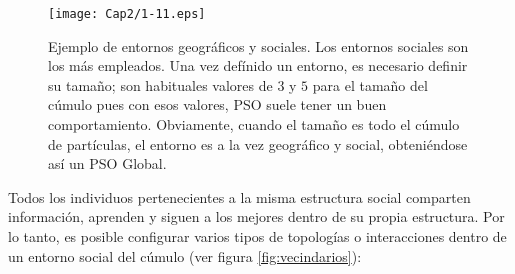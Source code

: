   \begin{figure}
	\centering
	\texttt{[image: Cap2/1-11.eps]}
	  \caption[Ejemplo de entornos geogr\'aficos y sociales]{Ejemplo de entornos geogr\'aficos y sociales. Los entornos sociales son los 
	  m\'as empleados. Una vez def\'inido un entorno, es necesario definir su tama\~no; son habituales valores de $3$ y $5$ 
	  para el tama\~no del c\'umulo pues con esos valores, PSO suele tener un buen comportamiento. Obviamente, cuando el tama\~no es 
	  todo el c\'umulo de part\'iculas, el entorno es a la vez geogr\'afico y social, obteni\'endose 
	  as\'i un PSO Global.}
      \label{fig:entornos}
      \end{figure}

  Todos los individuos pertenecientes a la misma estructura social comparten informaci\'on, aprenden y siguen a los mejores dentro de 
  su propia estructura. Por lo tanto, es posible configurar varios tipos de topolog\'ias o interacciones dentro de un entorno social 
  del c\'umulo (ver figura \ref{fig:vecindarios}):

